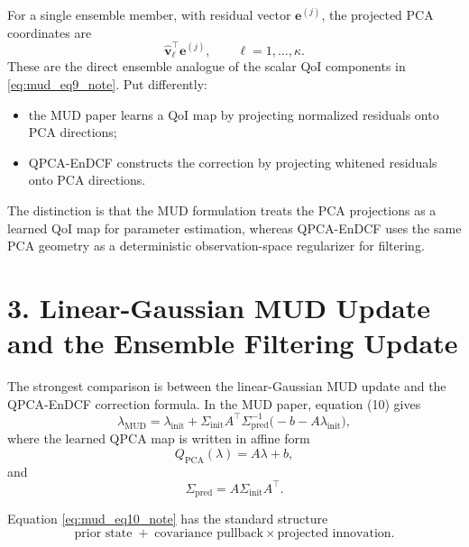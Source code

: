 \documentclass[11pt]{article}
\begin{document}
For a single ensemble member, with residual vector $\mathbf{e}^{(j)}$, the projected PCA coordinates are
\begin{equation}
\hat{\mathbf{v}}_\ell^\top \mathbf{e}^{(j)},
\qquad \ell=1,\dots,\kappa.
\end{equation}
These are the direct ensemble analogue of the scalar QoI components in \eqref{eq:mud_eq9_note}. Put differently:
\begin{itemize}
\item the MUD paper learns a QoI map by projecting normalized residuals onto PCA directions;
\item QPCA-EnDCF constructs the correction by projecting whitened residuals onto PCA directions.
\end{itemize}

The distinction is that the MUD formulation treats the PCA projections as a learned QoI map for parameter estimation, whereas QPCA-EnDCF uses the same PCA geometry as a deterministic observation-space regularizer for filtering.

\section*{3. Linear-Gaussian MUD Update and the Ensemble Filtering Update}

The strongest comparison is between the linear-Gaussian MUD update and the QPCA-EnDCF correction formula. In the MUD paper, equation (10) gives
\begin{equation}
\lambda_{\mathrm{MUD}}
=
\lambda_{\mathrm{init}}
+
\Sigma_{\mathrm{init}}A^\top \Sigma_{\mathrm{pred}}^{-1}
\bigl(-b - A\lambda_{\mathrm{init}}\bigr),
\label{eq:mud_eq10_note}
\end{equation}
where the learned QPCA map is written in affine form
\begin{equation}
Q_{\mathrm{PCA}}(\lambda)=A\lambda+b,
\end{equation}
and
\begin{equation}
\Sigma_{\mathrm{pred}} = A \Sigma_{\mathrm{init}} A^\top.
\end{equation}

Equation \eqref{eq:mud_eq10_note} has the standard structure
\begin{equation}
\text{prior state}
\;+\;
\text{covariance pullback}
\times
\text{projected innovation}.
\end{equation}
\end{document}
